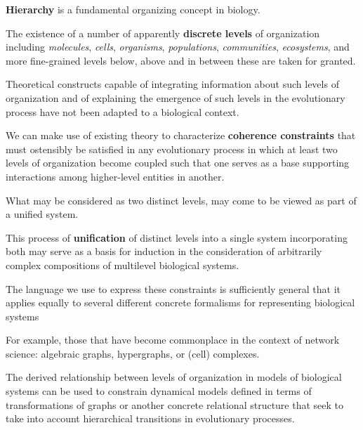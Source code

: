 \begin{frame}
\begin{block}{}
\textbf{Hierarchy} is a fundamental organizing concept in biology. 
\end{block}
\begin{block}{}
The existence of a number of apparently \textbf{discrete levels} of organization including {\it molecules}, {\it cells}, {\it organisms}, {\it populations}, {\it communities}, {\it ecosystems}, and more fine-grained levels below, above and in between these are taken for granted. 
\end{block}
\begin{block}{}
Theoretical constructs capable of integrating information about such levels of organization and of explaining the emergence of such levels in the evolutionary process have not been adapted to a biological context.
\end{block}
\end{frame}

\begin{frame}
\begin{block}{}
We can make use of existing theory to characterize \textbf{coherence constraints} that must ostensibly be satisfied in any evolutionary process in which at least two levels of organization become coupled such that one serves as a base supporting interactions among higher-level entities in another. 
\end{block}
\begin{block}{}
What may be considered as two distinct levels, may come to be viewed as part of a unified system.
\end{block}
\begin{block}{}
This process of \textbf{unification} of distinct levels into a single system incorporating both may serve as a basis for induction in the consideration of arbitrarily complex compositions of multilevel biological systems.
\end{block}
\end{frame}

\begin{frame}
\begin{block}{}
The language we use to express these constraints is sufficiently general that it applies equally to several different concrete formalisms for representing biological systems
\end{block}
\begin{block}{}
For example, those that have become commonplace in the context of network science: algebraic graphs, hypergraphs, or (cell) complexes. 
\end{block}
\begin{block}{}
The derived relationship between levels of organization in models of biological systems can be used to constrain dynamical models defined in terms of transformations of graphs or another concrete relational structure that seek to take into account hierarchical transitions in evolutionary processes.
\end{block}
\end{frame}

